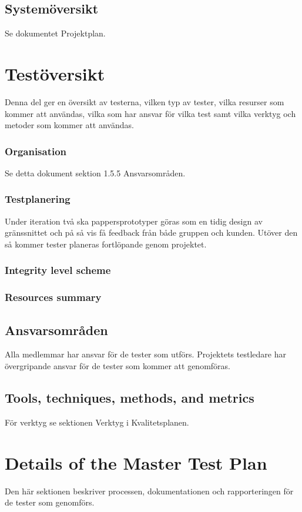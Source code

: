 \documentclass[a4paper,10pt]{article}
\begin{document}
\subsection{Systemöversikt}
Se dokumentet Projektplan.

\section{Testöversikt}
Denna del ger en översikt av testerna, vilken typ av tester, vilka resurser som kommer att användas, vilka som har ansvar för vilka test samt vilka verktyg och metoder som kommer att användas.

\subsubsection{Organisation}
Se detta dokument sektion 1.5.5 Ansvarsområden.

\subsubsection{Testplanering}
Under iteration två ska pappersprototyper göras som en tidig design av gränssnittet och på så vis få feedback från både gruppen och kunden. Utöver den så kommer tester planeras fortlöpande genom projektet.  

\subsubsection{Integrity level scheme}
\subsubsection{Resources summary}
\subsection{Ansvarsområden}
Alla medlemmar har ansvar för de tester som utförs. Projektets testledare har övergripande ansvar för de tester som kommer att genomföras.
\subsection{Tools, techniques, methods, and metrics}
För verktyg se sektionen Verktyg i Kvalitetsplanen.
\section{Details of the Master Test Plan} 
Den här sektionen beskriver processen, dokumentationen och rapporteringen för de tester som genomförs.
\end{document}
